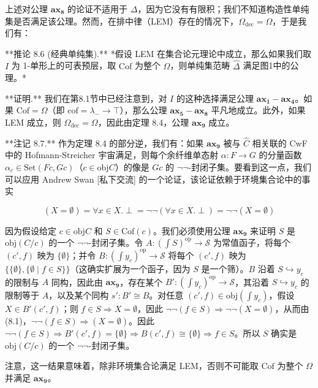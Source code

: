 \documentclass{ctexart}
\theoremstyle{plain}
\theoremstyle{definition}
\theoremstyle{definition}
\theoremstyle{definition}
\theoremstyle{definition}
\newcommand{\ax}[1]{\mathbf{ax_{#1}}}
\numberwithin{equation}{section}
\begin{document}
上述对公理 \(\ax{8}\) 的论证不适用于 \(\Delta\)，因为它没有有限积；我们不知道构造性单纯集是否满足该公理。然而，在排中律（LEM）存在的情况下，\(\Omega_{\text{dec}} = \Omega\)，于是我们有：

**推论 8.6 (经典单纯集).** *假设 LEM 在集合论元理论中成立，那么如果我们取 \(I\) 为 1-单形上的可表预层，取 \(\text{Cof}\) 为整个 \(\Omega\)，则单纯集范畴 \(\hat{\Delta}\) 满足图1中的公理。*

**证明.** 我们在第8.1节中已经注意到，对 \(I\) 的这种选择满足公理 \(\ax{1}-\ax{4}\)。如果 \(\text{Cof} = \Omega\)（即 \(\text{cof} = \lambda_- \to \top\)），那么公理 \(\ax{5}-\ax{8}\) 平凡地成立。此外，如果 LEM 成立，则 \(\Omega_{\text{dec}} = \Omega\)，因此由定理 8.4，公理 \(\ax{9}\) 成立。

**注记 8.7.** 作为定理 8.4 的部分逆，我们有：如果 \(\ax{9}\) 被与 \(\hat{C}\) 相关联的 CwF 中的 Hofmann-Streicher 宇宙满足，则每个余纤维单态射 \(\alpha : F \to G\) 的分量函数 \(\alpha_c \in \text{Set}(F c, G c)\)（\(c \in \text{obj} C\)）的像是 \(G c\) 的 \(\neg \neg\)-封闭子集。要看到这一点，我们可以应用 Andrew Swan [私下交流] 的一个论证，该论证依赖于环境集合论中的事实

\[(X = \emptyset) = \forall x \in X. \perp = \neg \neg (\forall x \in X. \perp) = \neg \neg (X = \emptyset) \tag{8.1}\]

因为假设给定 \(c \in \text{obj} C\) 和 \(S \in \text{Cof}(c)\)。我们必须使用公理 \(\ax{9}\) 来证明 \(S\) 是 \(\text{obj}(C/c)\) 的一个 \(\neg \neg\)-封闭子集。令 \(A : (\int S)^{\text{op}} \to \mathcal{S}\) 为常值函子，将每个 \((c', f)\) 映为 \(\{\emptyset\}\)；并令 \(B : (\int y_c)^{\text{op}} \to \mathcal{S}\) 将每个 \((c', f)\) 映为 \(\{\{\emptyset\}, \{\emptyset \mid f \in S\}\}\)（这确实扩展为一个函子，因为 \(S\) 是一个筛）。\(B\) 沿着 \(S \hookrightarrow y_c\) 的限制与 \(A\) 同构，因此由 \(\ax{9}\)，存在某个 \(B' : (\int y_c)^{\text{op}} \to \mathcal{S}\)，其沿着 \(S \hookrightarrow y_c\) 的限制等于 \(A\)，以及某个同构 \(s' : B' \cong B\)。对任意 \((c', f) \in \text{obj}(\int y_c)\)，假设 \(X \in B'(c', f)\)；则 \(f \in S \Rightarrow X = \emptyset\)，因此 \(\neg \neg (f \in S) \Rightarrow \neg \neg (X = \emptyset)\)，从而由 (8.1)，\(\neg \neg (f \in S) \Rightarrow (X = \emptyset)\)。因此 \(\neg \neg (f \in S) \Rightarrow B'(c', f) = \{\emptyset\} \Rightarrow B(c', f) \cong \{\emptyset\} \Rightarrow f \in S\)。所以 \(S\) 确实是 \(\text{obj}(C/c)\) 的一个 \(\neg \neg\)-封闭子集。

注意，这一结果意味着，除非环境集合论满足 LEM，否则不可能取 \(\text{Cof}\) 为整个 \(\Omega\) 并满足 \(\ax{9}\)。
\end{document}
